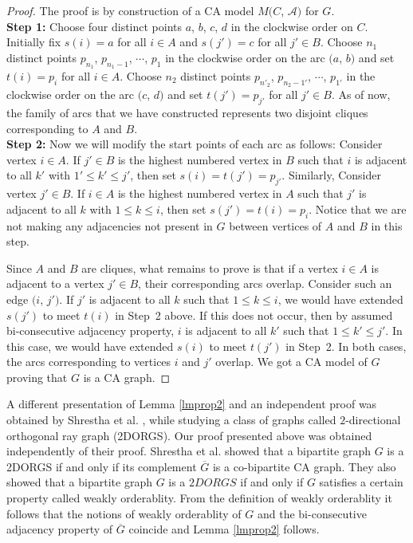  \begin{proof}
The proof is by construction of a CA model $M(C$, $\mathcal{A})$ for $G$.\\
\textbf{Step 1:} Choose four distinct points $a$, $b$, $c$, $d$ in the clockwise order on $C$. Initially fix $s(i) = a$  for all $i \in A$ and $s(j') = c$  for all $j' \in B$. Choose $n_1$ distinct points $p_{n_1}$, $p_{n_1 - 1}$, $\cdots$, $p_1$ in the clockwise order on the arc $(a$, $b)$ and set $t(i)=p_i$ for all $ i \in A$. Choose $n_2$ distinct points $p_{n'_2}$, $p_{{n_2 - 1}'}$, $\cdots$, $p_{1'}$ in the clockwise order on the arc $(c$, $d)$ and set  $t(j')=p_{j'}$ for all $ j' \in B$. As of now, the family of arcs that we have constructed represents two disjoint cliques corresponding to $A$ and $B$.\\
\textbf{Step 2:} Now we will modify the start points of each arc as follows: Consider vertex $i \in A$. If $j' \in B$ is the highest numbered vertex in $B$ such that $i$ is adjacent to all $k'$ with $1' \le k' \le j'$, then set $s(i) = t(j')= p_{j'}$. Similarly, Consider vertex $j' \in B$. If $i \in A$ is the highest numbered vertex in $A$ such that $j'$ is adjacent to all $k$ with $1 \le k \le i$, then set  $s(j') = t(i)= p_i$. Notice that we are not making any adjacencies not present in $G$ between vertices of $A$ and $B$ in this step.

 Since $A$ and $B$ are cliques, what remains to prove is that if a vertex $i \in A$ is adjacent to a vertex $j' \in B$, their corresponding arcs overlap. Consider such an edge $(i$, $j')$. If $j'$ is adjacent to all $k$ such that $1\le k \le i$, we would have extended $s(j')$ to meet $t(i)$ in Step~2 above. If this does not occur, then by assumed bi-consecutive adjacency property, $i$ is adjacent to all $k'$ such that $1\le k' \le j'$. In this case, we would have extended $s(i)$ to meet $t(j')$ in Step~2. In both cases, the arcs corresponding to vertices $i$ and $j'$ overlap. We got a CA model of $G$ proving that $G$ is a CA graph.
\end{proof}
\begin{remark}\label{rmk2}
A different presentation of Lemma \ref{lmprop2} and an independent proof was obtained by Shrestha et al. \cite{Shrestha10}, 
while studying a class of graphs called $2$-directional orthogonal ray graph (2DORGS). Our proof presented above was obtained independently of 
their proof. Shrestha et al. \cite{Shrestha10} showed that a bipartite graph $G$ is a 2DORGS if and only if its complement $\overline{G}$ 
is a co-bipartite CA graph. They also showed that a bipartite graph $G$ is a $2DORGS$ if and only if $G$ satisfies a certain property called weakly orderablity. 
From the definition of weakly orderablity it follows that the notions of weakly orderablity of $G$ and the bi-consecutive adjacency property of $\overline{G}$ 
coincide and Lemma \ref{lmprop2} follows.
\end{remark}
